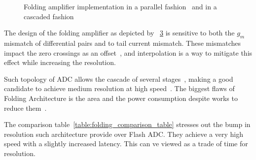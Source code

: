 \begin{figure}[htp]
	\centering
	\begin{subfigure}[b]{0.44\textwidth}
        \resizebox{\textwidth}{!}{}
        \label{fig:folding_amp_par}
    \end{subfigure}
    \begin{subfigure}[b]{0.52\textwidth}
        \resizebox{\textwidth}{!}{}
        \label{fig:folding_amp_casc}
    \end{subfigure}
	\caption{Folding amplifier implementation in a parallel fashion~\cite{Choe2001} and in a cascaded fashion~\cite{Vorenkamp1997}}
	\label{fig:folding_amplifier}
\end{figure}

The design of the folding amplifier as depicted by \figurename~\ref{fig:folding_amplifier} is sensitive to both the \(g_m\) mismatch of differential pairs and to tail current mismatch. These mismatches impact the zero crossings as an offset~\cite{Choe2001}, and interpolation is a way to mitigate this effect while increasing the resolution.

Such topology of ADC allows the cascade of several stages~\cite{Taft2009, Buck2017}, making a good candidate to achieve medium resolution at high speed~\cite{Vorenkamp1997, Pan2000}. The biggest flaws of Folding Architecture is the area and the power consumption despite works to reduce them~\cite{Costa2013}.

The comparison table~\ref{table:folding_comparison_table} stresses out the bump in resolution such architecture provide over Flash ADC\@. They achieve a very high speed with a slightly increased latency. This can ve viewed as a trade of time for resolution.

